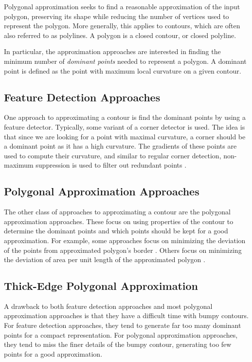 \documentclass[10pt,twocolumn,letterpaper]{article}
\begin{document}
Polygonal approximation seeks to find a reasonable approximation of the input polygon, preserving its shape while
reducing the number of vertices used to represent the polygon. More generally, this applies to contours, which are often
also referred to as polylines. A polygon is a closed contour, or closed polyline.

In particular, the approximation approaches are interested in finding the minimum number of \textit{dominant points}
needed to represent a polygon. A dominant point is defined as the point with maximum local curvature on a given contour.

\subsection{Feature Detection Approaches}

One approach to approximating a contour is find the dominant points by using a feature detector. Typically, some variant
of a corner detector is used. The idea is that since we are looking for a point with maximal curvature, a corner should
be a dominant point as it has a high curvature. The gradients of these points are used to compute their curvature, and
similar to regular corner detection, non-maximum suppression is used to filter out redundant points \cite{Teh1989}.

\subsection{Polygonal Approximation Approaches}

The other class of approaches to approximating a contour are the polygonal approximation approaches. These focus on
using properties of the contour to determine the dominant points and which points should be kept for a good
approximation. For example, some approaches focus on minimizing the deviation of the points from approximated polygon's
border \cite{Ramer1972}. Others focus on minimizing the deviation of area per unit length of the approximated polygon
\cite{Wall1984}.

\subsection{Thick-Edge Polygonal Approximation}

A drawback to both feature detection approaches and most polygonal approximation approaches is that they have a
difficult time with bumpy contours. For feature detection approaches, they tend to generate far too many dominant points
for a compact representation. For polygonal approximation approaches, they tend to miss the finer details of the bumpy
contour, generating too few points for a good approximation.
\end{document}
